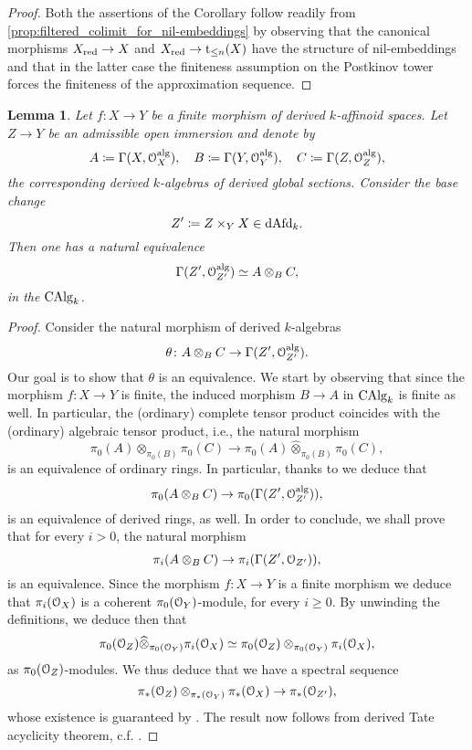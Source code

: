 \documentclass[10pt,a4paper,reqno]{amsart} %
\theoremstyle{plain}
\newtheorem{lem}[thm]{Lemma}
\theoremstyle{definition}
\theoremstyle{remark}
\numberwithin{equation}{section}
\begin{document}
\begin{proof}
    Both the assertions of the Corollary follow readily from \cref{prop:filtered_colimit_for_nil-embeddings} by observing that the
    canonical morphisms $X_{\mathrm{red}} \to X$ and $X_{\mathrm{red}} \to \mathrm t_{\le n}(X)$ have the structure of nil-embeddings and that in the latter case the finiteness assumption on the Postkinov
    tower forces the finiteness of the approximation
    sequence.
\end{proof}

\begin{lem} \label{lem:pullbacks_of_derived_affinoid_spaces_along_finite_morphisms_are_algebraic}
    Let $f \colon X \to Y$ be a finite morphism of derived $k$-affinoid spaces. Let $Z \to Y$ be an admissible open immersion and denote by
        \[
            A \coloneqq \Gamma(X, \mathcal O_X^\mathrm{alg}), \quad B \coloneqq \Gamma(Y, \mathcal O_Y^\mathrm{alg}), \quad C \coloneqq \Gamma(Z, \mathcal O_Z^\mathrm{alg}),  
        \]
    the corresponding derived $k$-algebras of derived global sections. Consider the base change
        \[
            Z' \coloneqq Z \times_Y X \in \mathrm{dAfd}_k.
        \]
    Then one has a natural equivalence
        \[
            \Gamma(Z', \mathcal O_{Z'}^\mathrm{alg}) \simeq A \otimes_B C,  
        \]
    in the \infcat $\mathrm{CAlg}_k$.
\end{lem}

\begin{proof}
    Consider the natural morphism of derived $k$-algebras
        \[
            \theta \colon A \otimes_B  C \to \Gamma(Z', \mathcal O_{Z'} ^\mathrm{alg}).
        \]
    Our goal is to show that $\theta$ is an equivalence. We start by observing that
    since the morphism $f \colon X \to Y$ is finite,
    the induced morphism $B \to A$ in $\mathrm{CAlg}_k$ is finite as well. In particular, the (ordinary) complete tensor product coincides with the (ordinary) algebraic tensor product, i.e.,
    the natural morphism
        \[
            \pi_0(A) \otimes_{\pi_0(B)} \pi_0(C) 
            \to \pi_0(A) \widehat{\otimes}_{\pi_0(B)} \pi_0(C)   ,
        \]
    is an equivalence of ordinary rings. In particular, thanks to \cite[Proposition 6.2 (5) and Theorem 6.5]{Porta_Yu_Derived_non-archimedean_analytic_spaces} we deduce that
        \[
            \pi_0(A \otimes_B C) \to \pi_0(\Gamma(Z', \mathcal O_{Z'}^\mathrm{alg})),  
        \]
    is an equivalence of derived rings, as well. In order to conclude, we shall prove that for every $i> 0$, the natural morphism
        \[
            \pi_i(A \otimes_B C) \to \pi_i(\Gamma(Z', \mathcal O_{Z'})),   
        \]
    is an equivalence. Since the morphism $f \colon X \to Y$ is a finite morphism we deduce that
    $\pi_i(\mathcal O_X)$ is a coherent $\pi_0(\mathcal O_Y)$-module, for every $i \ge 0$. By unwinding the definitions, we deduce then that
        \[
            \pi_0(\mathcal O_Z) \widehat{\otimes}_{\pi_0(\mathcal O_Y)}\pi_i(\mathcal O_X) \simeq \pi_0(\mathcal O_Z) \otimes_{\pi_0(\mathcal O_Y)} \pi_i(\mathcal O_X),
        \]
    as $\pi_0(\mathcal O_Z)$-modules. We thus deduce that we have a spectral sequence
        \[
            \pi_*(\mathcal O_Z) \otimes_{\pi_*(\mathcal O_Y)} \pi_*(\mathcal O_X) \rightarrow \pi_*(\mathcal O_{Z'}),
        \]
    whose existence is guaranteed by \cite[1.2.2.14]{Lurie_Higher_algebra}. The result now follows from
    derived Tate acyclicity theorem, c.f. \cite[Theorem 3.1]{Porta_Yu_Derived_Hom_spaces}.
\end{proof}
\end{document}
